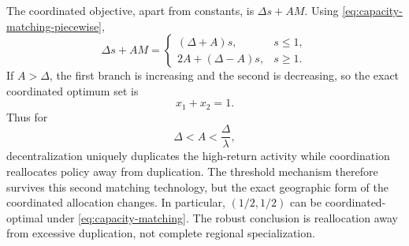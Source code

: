 The coordinated objective, apart from constants, is $\Delta s+A M$. Using \eqref{eq:capacity-matching-piecewise},
\begin{equation}
\Delta s+A M
=
\begin{cases}
(\Delta+A)s, & s\leq1,\\
2A+(\Delta-A)s, & s\geq1.
\end{cases}
\label{eq:capacity-planner-piecewise}
\end{equation}
If $A>\Delta$, the first branch is increasing and the second is decreasing, so the exact coordinated optimum set is
\begin{equation}
x_1+x_2=1.
\label{eq:capacity-optima}
\end{equation}
Thus for
\begin{equation}
\Delta<A<\frac{\Delta}{\lambda},
\end{equation}
decentralization uniquely duplicates the high-return activity while coordination reallocates policy away from duplication. The threshold mechanism therefore survives this second matching technology, but the exact geographic form of the coordinated allocation changes. In particular, $(1/2,1/2)$ can be coordinated-optimal under \eqref{eq:capacity-matching}. The robust conclusion is reallocation away from excessive duplication, not complete regional specialization.
